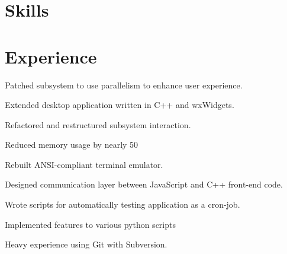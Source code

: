 \documentclass[letterpaper]{deedy-resume}
\begin{document}
\begin{minipage}[t]{0.66\textwidth}

\section{Skills}





\section{Experience}
\sectionspace
\sectionspace

\vspace{\topsep}
\begin{tightitemize}
\item Patched subsystem to use parallelism to enhance user experience.
\item Extended desktop application written in C++ and wxWidgets.
\item Refactored and restructured subsystem interaction.
\item Reduced memory usage by nearly 50\
\item Rebuilt ANSI-compliant terminal emulator.
\item Designed communication layer between JavaScript and C++ front-end code.
\item Wrote scripts for automatically testing application as a cron-job.
\item Implemented features to various python scripts
\item Heavy experience using Git with Subversion.
\end{tightitemize}


\end{minipage}
\end{document}
